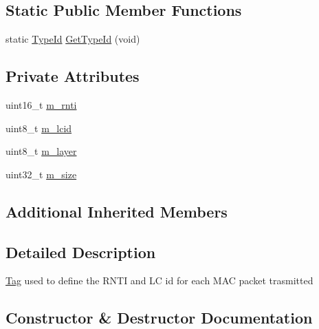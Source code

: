 \subsection*{Static Public Member Functions}
\begin{DoxyCompactItemize}
\item 
static \hyperlink{classns3_1_1TypeId}{Type\+Id} \hyperlink{classns3_1_1MmWaveRadioBearerTag_aee59453d4e05aef90fa39f92c4e75708}{Get\+Type\+Id} (void)
\end{DoxyCompactItemize}
\subsection*{Private Attributes}
\begin{DoxyCompactItemize}
\item 
uint16\+\_\+t \hyperlink{classns3_1_1MmWaveRadioBearerTag_aca3c3782a320065bcc3dbcb54f62f96f}{m\+\_\+rnti}
\item 
uint8\+\_\+t \hyperlink{classns3_1_1MmWaveRadioBearerTag_a17823c7f0da8af102979457e9a3e3e04}{m\+\_\+lcid}
\item 
uint8\+\_\+t \hyperlink{classns3_1_1MmWaveRadioBearerTag_a36f57dd50dc612e20d4a5229ed0751ac}{m\+\_\+layer}
\item 
uint32\+\_\+t \hyperlink{classns3_1_1MmWaveRadioBearerTag_aa4af9d40daf1f0311b3ee455b9dbf1c5}{m\+\_\+size}
\end{DoxyCompactItemize}
\subsection*{Additional Inherited Members}


\subsection{Detailed Description}
\hyperlink{classns3_1_1Tag}{Tag} used to define the R\+N\+TI and LC id for each M\+AC packet trasmitted 

\subsection{Constructor \& Destructor Documentation}
